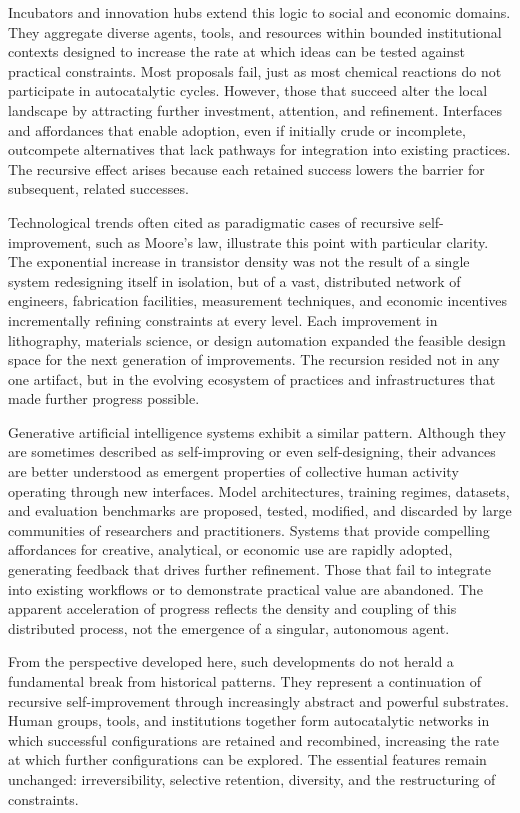 \documentclass[11pt]{article}
\begin{document}
Incubators and innovation hubs extend this logic to social and economic domains. They aggregate diverse agents, tools, and resources within bounded institutional contexts designed to increase the rate at which ideas can be tested against practical constraints. Most proposals fail, just as most chemical reactions do not participate in autocatalytic cycles. However, those that succeed alter the local landscape by attracting further investment, attention, and refinement. Interfaces and affordances that enable adoption, even if initially crude or incomplete, outcompete alternatives that lack pathways for integration into existing practices. The recursive effect arises because each retained success lowers the barrier for subsequent, related successes.

Technological trends often cited as paradigmatic cases of recursive self-improvement, such as Moore’s law, illustrate this point with particular clarity. The exponential increase in transistor density was not the result of a single system redesigning itself in isolation, but of a vast, distributed network of engineers, fabrication facilities, measurement techniques, and economic incentives incrementally refining constraints at every level. Each improvement in lithography, materials science, or design automation expanded the feasible design space for the next generation of improvements. The recursion resided not in any one artifact, but in the evolving ecosystem of practices and infrastructures that made further progress possible.

Generative artificial intelligence systems exhibit a similar pattern. Although they are sometimes described as self-improving or even self-designing, their advances are better understood as emergent properties of collective human activity operating through new interfaces. Model architectures, training regimes, datasets, and evaluation benchmarks are proposed, tested, modified, and discarded by large communities of researchers and practitioners. Systems that provide compelling affordances for creative, analytical, or economic use are rapidly adopted, generating feedback that drives further refinement. Those that fail to integrate into existing workflows or to demonstrate practical value are abandoned. The apparent acceleration of progress reflects the density and coupling of this distributed process, not the emergence of a singular, autonomous agent.

From the perspective developed here, such developments do not herald a fundamental break from historical patterns. They represent a continuation of recursive self-improvement through increasingly abstract and powerful substrates. Human groups, tools, and institutions together form autocatalytic networks in which successful configurations are retained and recombined, increasing the rate at which further configurations can be explored. The essential features remain unchanged: irreversibility, selective retention, diversity, and the restructuring of constraints.
\end{document}
